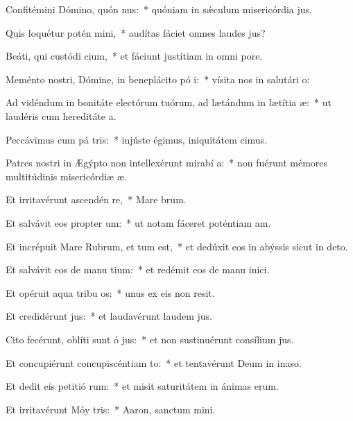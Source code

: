 \item Confitémini Dómino, quón nus:~* quóniam in sǽculum misericórdia jus.
\item Quis loquétur potén mini,~* audítas fáciet omnes laudes jus?
\item Beáti, qui custódi cium,~* et fáciunt justítiam in omni pore.
\item Meménto nostri, Dómine, in beneplácito pó i:~* vísita nos in salutári o:
\item Ad vidéndum in bonitáte electórum tuórum, ad lætándum in lætítia  æ:~* ut laudéris cum hereditáte a.
\item Peccávimus cum pá tris:~* injúste égimus, iniquitátem cimus.
\item Patres nostri in Ægýpto non intellexérunt mirabí a:~* non fuérunt mémores multitúdinis misericórdiæ æ.
\item Et irritavérunt ascendén  re,~* Mare brum.
\item Et salvávit eos propter  um:~* ut notam fáceret poténtiam am.
\item Et incrépuit Mare Rubrum, et tum est,~* et dedúxit eos in abýssis sicut in deto.
\item Et salvávit eos de manu tium:~* et redémit eos de manu inici.
\item Et opéruit aqua tribu os:~* unus ex eis non resit.
\item Et credidérunt  jus:~* et laudavérunt laudem jus.
\item Cito fecérunt, oblíti sunt ó jus:~* et non sustinuérunt consílium jus.
\item Et concupiérunt concupiscéntiam  to:~* et tentavérunt Deum in inaso.
\item Et dedit eis petitió rum:~* et misit saturitátem in ánimas erum.
\item Et irritavérunt Móy  tris:~* Aaron, sanctum mini.
